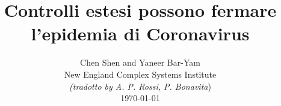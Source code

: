 \documentclass[onecolumn,journal]{IEEEtran}
\begin{document}
\title{\color{Brown} Controlli estesi possono fermare l’epidemia di Coronavirus \\
\vspace{-0.35ex}}
\author{Chen Shen and Yaneer Bar-Yam \\ New England Complex Systems Institute \\
\vspace{+0.35ex}
\small{\textit{(tradotto by A. P. Rossi, P. Bonavita})}\\
 \today
  \vspace{-14ex} \\


\bigskip
\bigskip

\textbf{}
 }

\maketitle


\flushbottom %



\thispagestyle{empty} %




\renewcommand{\thefootnote}{\fnsymbol{footnote}}
\end{document}
